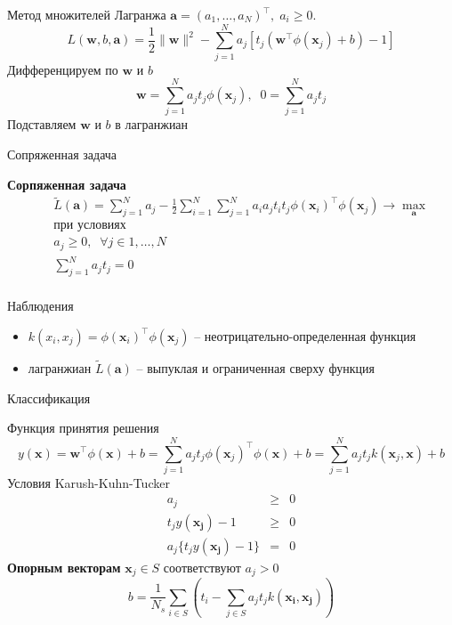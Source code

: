 \documentclass[10pt,a4paper]{beamer}
\begin{document}

\begin{frame}{}

Метод множителей Лагранжа $\mathbf{a} = (a_1, \ldots, a_N)^\top,\;a_i \geq 0$.
\[
L(\mathbf{w}, b, \mathbf{a}) = \frac 1 2 \|\mathbf{w}\|^2 - \sum_{j=1}^N a_j [t_j (\mathbf{w}^\top \phi(\mathbf{x}_j) + b) - 1]
\]
Дифференцируем по $\mathbf{w}$ и $b$
\[
\mathbf{w} = \sum_{j=1}^N a_j t_j \phi(\mathbf{x}_j), \;\; 0 = \sum_{j=1}^N a_j t_j
\]
Подставляем $\mathbf{w}$ и $b$ в лагранжиан

\end{frame}


\begin{frame}{Сопряженная задача}

\begin{framed}
{\bf Сорпяженная задача}
\begin{eqnarray*}
&& \tilde{L}(\mathbf{a}) = \sum_{j=1}^N a_j - \frac{1}{2} \sum_{i=1}^N \sum_{j=1}^N a_i a_j t_i t_j \phi(\mathbf{x}_i)^\top \phi(\mathbf{x}_j) \rightarrow \max_{\mathbf{a}} \\
&& \text{при условиях} \\
&& a_j \geq 0, \;\; \forall j \in 1,\ldots,N \\
&& \sum_{j=1}^N a_j t_j = 0\\
\end{eqnarray*}
\end{framed}

Наблюдения
\begin{itemize}
\item $k(x_i, x_j) = \phi(\mathbf{x}_i)^\top \phi(\mathbf{x}_j)$ -- неотрицательно-определенная функция
\item лагранжиан $\tilde L(\mathbf{a})$ -- выпуклая и ограниченная сверху функция
\end{itemize}

\end{frame}


\begin{frame}{Классификация}

Функция принятия решения
\[
y(\mathbf{x}) = \mathbf{w}^\top \phi(\mathbf{x}) + b = \sum_{j=1}^N a_j t_j \phi(\mathbf{x}_j)^\top  \phi(\mathbf{x}) + b = \sum_{j=1}^N a_j t_j k(\mathbf{x}_j, \mathbf{x}) + b
\]
Условия Karush-Kuhn-Tucker
\begin{eqnarray*}
a_j &\geq& 0 \\
t_j y(\mathbf{x_j}) - 1 &\geq& 0 \\
a_j \{t_j y(\mathbf{x_j}) - 1\} &=& 0
\end{eqnarray*}
{\bf Опорным векторам} $\mathbf{x}_j \in S$ соответствуют $a_j > 0$
\[
b = \frac{1}{N_s} \sum_{i \in S} \left( t_i - \sum_{j \in S} a_j t_j k(\mathbf{x_i}, \mathbf{x_j})\right)
\]

\end{frame}
\end{document}
